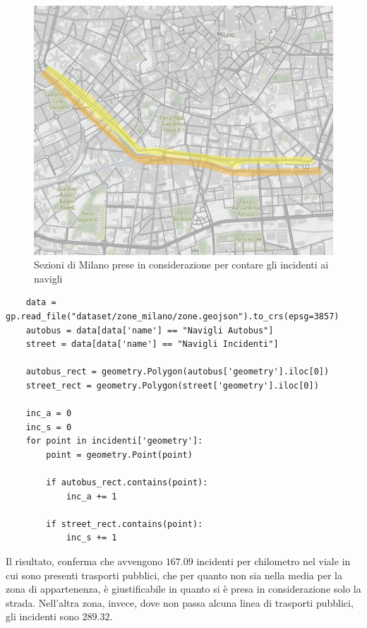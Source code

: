 \documentclass[a4paper]{report}
\begin{document}
\begin{figure}
    \includegraphics[width=\linewidth]{../src/atm/zona_navigli_rect.png}
    \caption{Sezioni di Milano prese in considerazione per contare gli incidenti ai navigli}
    \label{fig:zona-navigli-rect}
\end{figure}

\begin{lstlisting}
    data = gp.read_file("dataset/zone_milano/zone.geojson").to_crs(epsg=3857)
    autobus = data[data['name'] == "Navigli Autobus"]
    street = data[data['name'] == "Navigli Incidenti"]

    autobus_rect = geometry.Polygon(autobus['geometry'].iloc[0])
    street_rect = geometry.Polygon(street['geometry'].iloc[0])

    inc_a = 0
    inc_s = 0
    for point in incidenti['geometry']: 
        point = geometry.Point(point)

        if autobus_rect.contains(point): 
            inc_a += 1
        
        if street_rect.contains(point): 
            inc_s += 1
\end{lstlisting}

Il risultato, conferma che avvengono $167.09$ incidenti per chilometro 
nel viale in cui sono presenti trasporti pubblici, che per quanto non sia nella media per la zona 
di appartenenza, è giustificabile in quanto si è presa in considerazione solo la strada.
Nell'altra zona, invece, dove non passa alcuna linea di trasporti pubblici, 
gli incidenti sono $289.32$. 
\end{document}
